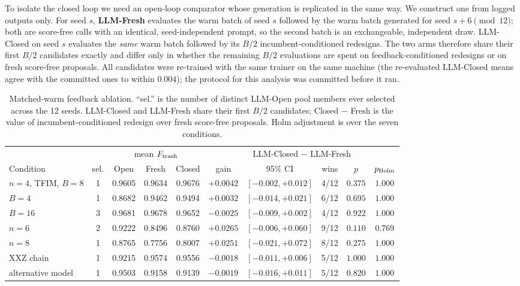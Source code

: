 \documentclass[11pt]{article}
\begin{document}
To isolate the closed loop we need an open-loop comparator whose generation is
replicated in the same way. We construct one from logged outputs only.
For seed $s$, \textbf{LLM-Fresh} evaluates the warm batch of seed $s$ followed by the
warm batch generated for seed $s+6 \pmod{12}$; both are score-free calls with an
identical, seed-independent prompt, so the second batch is an exchangeable,
independent draw.
LLM-Closed on seed $s$ evaluates the \emph{same} warm batch followed by its $B/2$
incumbent-conditioned redesigns.
The two arms therefore share their first $B/2$ candidates exactly and differ only in
whether the remaining $B/2$ evaluations are spent on feedback-conditioned redesigns or
on fresh score-free proposals. All candidates were re-trained with the same trainer on
the same machine (the re-evaluated LLM-Closed means agree with the committed ones to
within $0.004$); the protocol for this analysis was committed before it ran.

\begin{table}[t]
\centering\small
\caption{Matched-warm feedback ablation. ``sel.'' is the number of distinct LLM-Open
pool members ever selected across the 12 seeds. LLM-Closed and LLM-Fresh share their
first $B/2$ candidates; Closed $-$ Fresh is the value of incumbent-conditioned redesign
over fresh score-free proposals. Holm adjustment is over the seven conditions.}
\label{tab:matched}
\setlength{\tabcolsep}{4pt}
\begin{tabular}{lccccccccc}
\toprule
& & \multicolumn{3}{c}{mean $F_{\rm trash}$} & \multicolumn{5}{c}{LLM-Closed $-$ LLM-Fresh}\\
Condition & sel. & Open & Fresh & Closed & gain & 95\% CI & wins & $p$ & $p_{\rm Holm}$\\
\midrule
$n{=}4$, TFIM, $B{=}8$ & 1 & 0.9605 & 0.9634 & 0.9676 & $+0.0042$ & $[-0.002,+0.012]$ & 4/12 & $0.375$ & $1.000$ \\
$B{=}4$ & 1 & 0.8682 & 0.9462 & 0.9494 & $+0.0032$ & $[-0.014,+0.021]$ & 6/12 & $0.695$ & $1.000$ \\
$B{=}16$ & 3 & 0.9681 & 0.9678 & 0.9652 & $-0.0025$ & $[-0.009,+0.002]$ & 4/12 & $0.922$ & $1.000$ \\
$n{=}6$ & 2 & 0.9222 & 0.8496 & 0.8760 & $+0.0265$ & $[-0.006,+0.060]$ & 9/12 & $0.110$ & $0.769$ \\
$n{=}8$ & 1 & 0.8765 & 0.7756 & 0.8007 & $+0.0251$ & $[-0.021,+0.072]$ & 8/12 & $0.275$ & $1.000$ \\
XXZ chain & 1 & 0.9215 & 0.9574 & 0.9556 & $-0.0018$ & $[-0.011,+0.006]$ & 5/12 & $1.000$ & $1.000$ \\
alternative model & 1 & 0.9503 & 0.9158 & 0.9139 & $-0.0019$ & $[-0.016,+0.011]$ & 5/12 & $0.820$ & $1.000$ \\
\bottomrule
\end{tabular}
\end{table}
\end{document}

